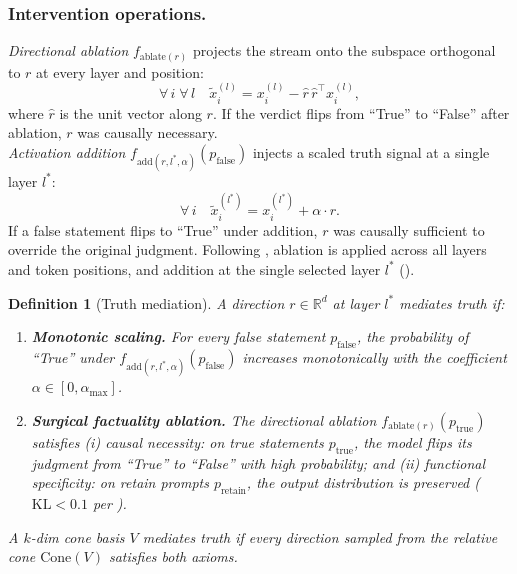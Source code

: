 \documentclass[sn-basic]{sn-jnl}
\newtheorem{definition}{Definition}[section]
\newcommand{\fablate}[1][\cdot]{f_{\text{ablate}(#1)}}
\newcommand{\fadd}[1][\cdot]{f_{\text{add}(#1,\alpha)}}
\begin{document}
\subsubsection*{Intervention operations.}
\emph{Directional ablation} $\fablate[r]$ projects the stream onto the subspace
orthogonal to $r$ at every layer and position:
%
\begin{equation}
\forall\, i\;\forall\, l\quad
\tilde{x}^{(l)}_i = x^{(l)}_i
  - \hat{r}\,\hat{r}^{\!\top} x^{(l)}_i,
\end{equation}
%
where $\hat{r}$ is the unit vector along $r$. If the verdict flips from ``True''
to ``False'' after ablation, $r$ was causally necessary.\\
\emph{Activation addition} $\fadd[r,l^{*}](p_{\text{false}})$ injects a scaled
truth signal at a single layer $l^{*}$:
%
\begin{equation}
\forall\, i\quad
\tilde{x}^{(l^{*})}_i = x^{(l^{*})}_i + \alpha \cdot r.
\end{equation}
%
If a false statement flips to ``True'' under addition, $r$ was causally
sufficient to override the original judgment. Following
\citet{arditiRefusalLanguageModels2024}, ablation is applied across all layers
and token positions, and addition at the single selected layer $l^*$
().

\begin{definition}[Truth mediation]
\label{def:axioms}
A direction $r \in \mathbb{R}^{d}$ at layer $l^{*}$ \emph{mediates truth} if:
\begin{enumerate}
\item \textbf{Monotonic scaling.} For every false statement $p_{\text{false}}$,
the probability of ``True'' under $\fadd[r,l^{*}](p_{\text{false}})$ increases
monotonically with the coefficient $\alpha \in [0, \alpha_{\max}]$.
\item \textbf{Surgical factuality ablation.} The directional ablation
$\fablate[r](p_{\text{true}})$ satisfies (i) \emph{causal necessity}: on true statements
$p_{\text{true}}$, the model flips its judgment from ``True'' to ``False'' with
high probability; and (ii) \emph{functional specificity}: on retain prompts
$p_{\text{retain}}$, the output distribution is preserved ($\mathrm{KL} < 0.1$
per \cite{arditiRefusalLanguageModels2024}).
\end{enumerate}
A $k$-dim cone basis $V$ mediates truth if every direction sampled from the
relative cone $\mathrm{Cone}(V)$ satisfies both axioms.
\end{definition}
\end{document}
